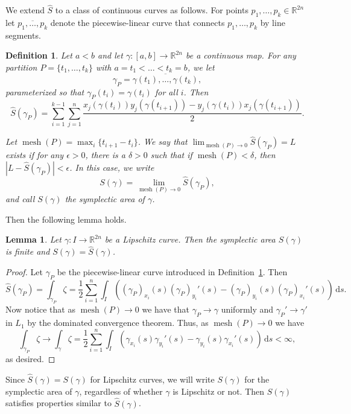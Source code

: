 \documentclass[12pt,reqno]{amsart}
\DeclareMathOperator{\mesh}{mesh}
\newcommand{\R}{\mathbb{R}}
\newcommand{\ud}[0]{\,\mathrm{d}}
\newcommand{\from}{\colon}
\newtheorem{lemma}[thm]{Lemma}
\newtheorem{defn}[thm]{Definition}
\theoremstyle{remark}
\newcommand{\0}{\mathbf{0}}
\renewcommand{\1}{\mathbf 1}
\begin{document}
We extend $\hat{S}$ to a class of continuous curves as follows.
For points $p_1,\dots, p_k\in \R^{2n}$ let $\overline{p_1,\dots,p_k}$ denote the piecewise-linear curve that connects $p_1,\dots,p_k$ by line segments.

\begin{defn}\label{def:LevySimplecticArea}
  Let $a<b$ and let $\gamma\from [a,b] \to \R^{2n}$ be a continuous map. For any partition $P=\{t_1,\dots,t_k\}$ with $a=t_1<\dots<t_k=b$, we let 
  $$\gamma_P = \overline{\gamma(t_1),\dots, \gamma(t_{k})},$$
  parameterized so that $\gamma_P(t_i) = \gamma(t_i)$ for all $i$. Then
  \begin{equation}\label{eqn:SymplecticArea}
    \hat{S}(\gamma_P) = \sum_{i=1}^{k-1} \sum_{j=1}^n \frac{x_j(\gamma(t_i)) y_j(\gamma(t_{i+1})) - y_j(\gamma(t_i)) x_j(\gamma(t_{i+1}))}{2}.
  \end{equation}
    
  Let $\mesh(P)=\max_i \{t_{i+1}-t_i\}$. We say that \(\lim_{\mesh(P)\to 0} \hat{S}(\gamma_P)=L\) exists if for any $\epsilon>0$, there is a $\delta>0$ such that if $\mesh(P)<\delta$, then $|L - \hat{S}(\gamma_P)|<\epsilon$. In this case, we write
  $$
  S(\gamma) = \lim_{\mesh(P)\to 0} \hat{S}(\gamma_P),
  $$
  and call $S(\gamma)$ the \emph{symplectic area} of $\gamma$.
\end{defn}

Then the following lemma holds.
\begin{lemma}\label{lem:symplectic-consistent}
  Let $\gamma\from I\to\mathbb R^{2n}$ be a Lipschitz curve. Then the symplectic area $S(\gamma)$ is finite and $S(\gamma) = \hat{S}(\gamma)$.
\end{lemma}
\begin{proof}
Let $\gamma_P$ be the piecewise-linear curve introduced in Definition~\ref{def:LevySimplecticArea}. Then
    \[\hat{S}(\gamma_P) =
    \int_{\gamma_P}\zeta = \frac{1}{2}\sum_{i=1}^n\int_I \left((\gamma_P)_{x_i}(s)(\gamma_P)_{y_i}'(s)- (\gamma_P)_{y_i}(s)(\gamma_P)_{x_i}'(s)\right)\ud s.
    \]
    Now notice that as $\mesh(P)\to 0$ we have that $\gamma_P\to \gamma$ uniformly and $\gamma_P'\to \gamma'$ in $L_1$ by the dominated convergence theorem. Thus, as $\mesh(P)\to 0$ we have
    \[
    \int_{\gamma_P}\zeta\to\int_\gamma \zeta = \frac{1}{2}\sum_{i=1}^n\int_I \left(\gamma_{x_i}(s)\gamma_{y_i}'(s)- \gamma_{y_i}(s)\gamma_{x_i}'(s)\right)\ud s<\infty,
    \]
    as desired.
\end{proof}

Since $\hat{S}(\gamma) = S(\gamma)$ for Lipschitz curves, we will write $S(\gamma)$ for the symplectic area of $\gamma$, regardless of whether $\gamma$ is Lipschitz or not. Then $S(\gamma)$ satisfies properties similar to $\hat{S}(\gamma)$.
\end{document}
